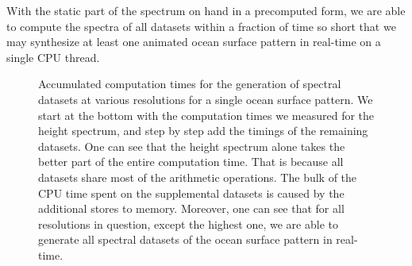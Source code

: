 With the static part of the spectrum on hand in a precomputed form, we are able
to compute the spectra of all datasets within a fraction of time so short that
we may synthesize at least one animated ocean surface pattern in real-time on
a single CPU thread.
%
%
\begin{figure}
\centering
\mydata
{}
\caption[Accumulated computation times for the generation of spectral datasets at
various resolutions for a single ocean surface pattern.]{
Accumulated computation times for the generation of spectral datasets at
various resolutions for a single ocean surface pattern.
We start at the bottom with the computation times we measured for the height
spectrum, and step by step add the timings of the remaining datasets.
One can see that the height spectrum alone takes the better
part of the entire computation time.
That is because all datasets share most of the arithmetic operations.
The bulk of the CPU time spent on the supplemental datasets is caused by the
additional stores to memory.
Moreover, one can see that for all resolutions in question, except the highest
one, we are able to generate all spectral datasets of the ocean surface pattern
in real-time.}
\label{fig:results:h}
\end{figure}
